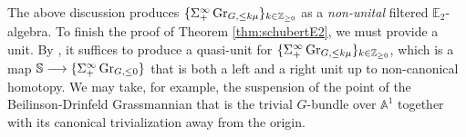 The above discussion produces $\{ \Sigma^{\infty}_+ \operatorname{\mathrm{Gr}}_{G,\leq k\mu}\}_{k \in \mathbb{Z}_{\geq 0}}$ as a \textit{non-unital} filtered $\mathbb{E}_2$-algebra.  To finish the proof of Theorem \ref{thm:schubertE2}, we must provide a unit.  By \cite[Theorem 5.4.4.5]{HA}, it suffices to produce a quasi-unit for $\{ \Sigma^{\infty}_+ \operatorname{\mathrm{Gr}}_{G,\leq k\mu}\}_{k \in \mathbb{Z}_{\geq 0}}$, which is a map $\mathbb{S} \longrightarrow \{ \Sigma^{\infty}_+ \operatorname{\mathrm{Gr}}_{G,\leq 0}\}$ that is both a left and a right unit up to non-canonical homotopy.  We may take, for example, the suspension of the point of the Beilinson-Drinfeld Grassmannian that is the trivial $G$-bundle over $\mathbb{A}^1$ together with its canonical trivialization away from the origin.
